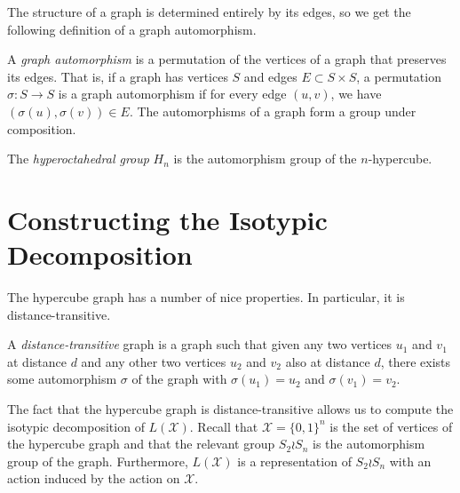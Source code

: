 \documentclass[cclicense]{hmcthesis}
\providecommand*{\xs}{\mathcal X}
\numberwithin{equation}{chapter}
\numberwithin{thmcounter}{chapter}
\begin{document}
    The structure of a graph is determined entirely by its edges, so we get the
    following definition of a graph automorphism.
    \begin{definition}
        A \emph{graph automorphism} is a permutation of the vertices of a graph
        that preserves its edges.  That is, if a graph has vertices $S$ and
        edges $E \subset S \times S$, a permutation $\sigma: S \to S$ is a graph
        automorphism if for every edge $(u, v)$, we have $(\sigma(u), \sigma(v))
        \in E$.  The automorphisms of a graph form a group under composition.
    \end{definition}

    \begin{definition}
        The \emph{hyperoctahedral group} $H_n$ is the automorphism group of the
        $n$-hypercube.
    \end{definition}

\section{Constructing the Isotypic Decomposition}
    The hypercube graph has a number of nice properties.  In particular, it is
    distance-transitive. 
    \begin{definition}
        A \emph{distance-transitive} graph is a graph such that given any two
        vertices $u_1$ and $v_1$ at distance $d$ and any other two vertices
        $u_2$ and $v_2$ also at distance $d$, there exists some automorphism
        $\sigma$ of the graph with $\sigma(u_1) = u_2$ and $\sigma(v_1) = v_2$.
    \end{definition}
    The fact that the hypercube graph is distance-transitive allows us to
    compute the isotypic decomposition of $L(\xs)$.  Recall that $\xs = \{0,
    1\}^n$ is the set of vertices of the hypercube graph and that the relevant
    group $S_2 \wr S_n$ is the automorphism group of the graph.  Furthermore,
    $L(\xs)$ is a representation of $S_2 \wr S_n$ with an action induced by the
    action on $\xs$.
\end{document}
